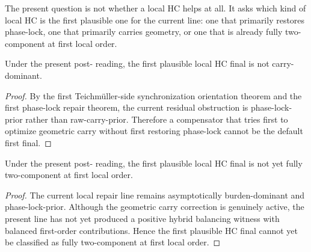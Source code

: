 \begin{remark}
\label{rem:what-the-hc-classification-is-trying-to-decide}
The present question is not whether a local HC helps at all. It asks which kind of local HC is the first plausible one for the current line: one that primarily restores phase-lock, one that primarily carries geometry, or one that is already fully two-component at first local order.
\end{remark}

\begin{proposition}
\label{prop:current-line-is-not-carry-dominant-on-the-hc-side}
Under the present post- reading, the first plausible local HC final is not carry-dominant.
\end{proposition}

\begin{proof}
By the first Teichm\"uller-side synchronization orientation theorem and the first phase-lock repair theorem, the current residual obstruction is phase-lock-prior rather than raw-carry-prior. Therefore a compensator that tries first to optimize geometric carry without first restoring phase-lock cannot be the default first final.
\end{proof}

\begin{proposition}
\label{prop:current-line-is-not-yet-fully-two-component-on-the-hc-side}
Under the present post- reading, the first plausible local HC final is not yet fully two-component at first local order.
\end{proposition}

\begin{proof}
The current local repair line remains asymptotically burden-dominant and phase-lock-prior. Although the geometric carry correction is genuinely active, the present line has not yet produced a positive hybrid balancing witness with balanced first-order contributions. Hence the first plausible HC final cannot yet be classified as fully two-component at first local order.
\end{proof}

